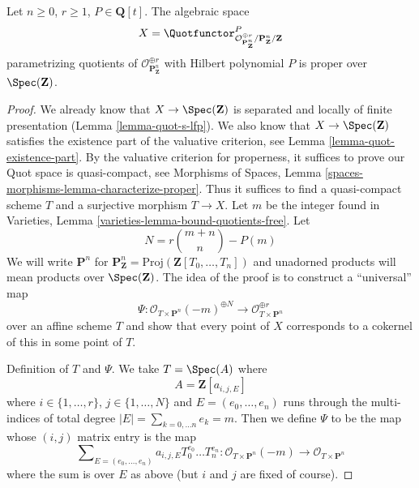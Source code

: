 %
\begin{lemma}
\label{lemma-quot-Pn}
Let $n \geq 0$, $r \geq 1$, $P \in \mathbf{Q}[t]$.
The algebraic space
$$
X = \Quotfunctor^P_{\mathcal{O}^{\oplus r}_{\mathbf{P}^n_\mathbf{Z}}/
\mathbf{P}^n_\mathbf{Z}/\mathbf{Z}}
$$
parametrizing quotients of $\mathcal{O}_{\mathbf{P}^n_\mathbf{Z}}^{\oplus r}$
with Hilbert polynomial $P$ is proper over $\Spec(\mathbf{Z})$.
\end{lemma}

\begin{proof}
We already know that $X \to \Spec(\mathbf{Z})$ is separated and
locally of finite presentation (Lemma \ref{lemma-quot-s-lfp}).
We also know that $X \to \Spec(\mathbf{Z})$ satisfies the
existence part of the valuative criterion, see
Lemma \ref{lemma-quot-existence-part}.
By the valuative criterion for properness, it suffices to
prove our Quot space is quasi-compact, see
Morphisms of Spaces,
Lemma \ref{spaces-morphisms-lemma-characterize-proper}.
Thus it suffices to find a quasi-compact scheme $T$ and a surjective
morphism $T \to X$. Let $m$ be the integer found in
Varieties, Lemma \ref{varieties-lemma-bound-quotients-free}.
Let
$$
N = r{m + n \choose n} - P(m)
$$
We will write $\mathbf{P}^n$ for
$\mathbf{P}^n_\mathbf{Z} = \text{Proj}(\mathbf{Z}[T_0, \ldots, T_n])$
and unadorned products will mean products over $\Spec(\mathbf{Z})$.
The idea of the proof is to construct a ``universal'' map
$$
\Psi :
\mathcal{O}_{T \times \mathbf{P}^n}(-m)^{\oplus N}
\longrightarrow
\mathcal{O}_{T \times \mathbf{P}^n}^{\oplus r}
$$
over an affine scheme $T$ and show that every point of $X$
corresponds to a cokernel of this in some point of $T$.

\medskip\noindent
Definition of $T$ and $\Psi$. We take $T = \Spec(A)$ where
$$
A = \mathbf{Z}[a_{i, j, E}]
$$
where $i \in \{1, \ldots, r\}$, $j \in \{1, \ldots, N\}$
and $E = (e_0, \ldots, e_n)$ runs through the multi-indices
of total degree $|E| = \sum_{k = 0, \ldots n} e_k = m$.
Then we define $\Psi$ to be the map whose $(i, j)$ matrix
entry is the map
$$
\sum\nolimits_{E = (e_0, \ldots, e_n)}
a_{i, j, E} T_0^{e_0} \ldots T_n^{e_n} :
\mathcal{O}_{T \times \mathbf{P}^n}(-m)
\longrightarrow
\mathcal{O}_{T \times \mathbf{P}^n}
$$
where the sum is over $E$ as above (but $i$ and $j$ are fixed of course).


\end{proof}
